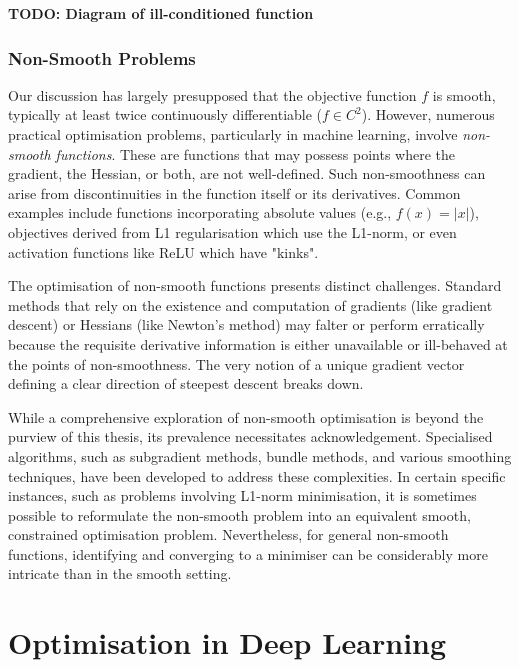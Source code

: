 \textbf{TODO: Diagram of ill-conditioned function}

\subsubsection{Non-Smooth Problems}
\label{sssec:non_smooth_problems}

Our discussion has largely presupposed that the objective function $f$ is smooth, typically at least twice continuously differentiable ($f \in C^2$). However, numerous practical optimisation problems, particularly in machine learning, involve \textit{non-smooth functions}. These are functions that may possess points where the gradient, the Hessian, or both, are not well-defined. Such non-smoothness can arise from discontinuities in the function itself or its derivatives. Common examples include functions incorporating absolute values (e.g., $f(x) = |x|$), objectives derived from L1 regularisation which use the L1-norm, or even activation functions like ReLU which have "kinks".

The optimisation of non-smooth functions presents distinct challenges. Standard methods that rely on the existence and computation of gradients (like gradient descent) or Hessians (like Newton's method) may falter or perform erratically because the requisite derivative information is either unavailable or ill-behaved at the points of non-smoothness. The very notion of a unique gradient vector defining a clear direction of steepest descent breaks down.

While a comprehensive exploration of non-smooth optimisation is beyond the purview of this thesis, its prevalence necessitates acknowledgement. Specialised algorithms, such as subgradient methods, bundle methods, and various smoothing techniques, have been developed to address these complexities. In certain specific instances, such as problems involving L1-norm minimisation, it is sometimes possible to reformulate the non-smooth problem into an equivalent smooth, constrained optimisation problem. Nevertheless, for general non-smooth functions, identifying and converging to a minimiser can be considerably more intricate than in the smooth setting.

\section{Optimisation in Deep Learning}
\label{sec:optimisation_in_deep_learning}


